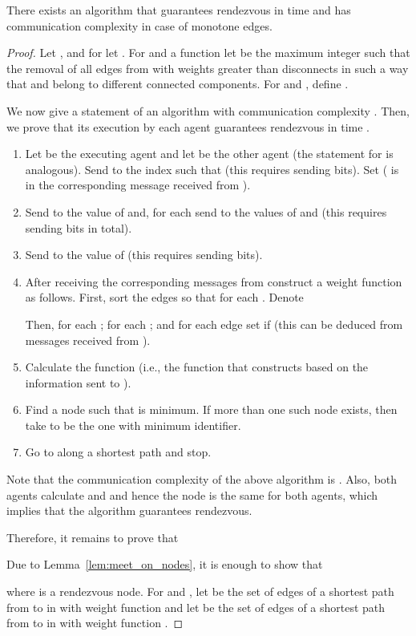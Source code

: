 \documentclass{llncs}
\begin{document}
\begin{theorem} \label{thm:monotone_edges+no-visibility}
There exists an algorithm that guarantees rendezvous in   time and 
has communication complexity  in case of monotone edges.
\end{theorem}
\begin{proof}
Let , and for  let .
For  and a function  let  be the maximum integer such that the removal of all edges from  with weights greater than  disconnects  in such a way that  and  belong to different connected components.
For  and , define .

We now give a statement of an algorithm with communication complexity .
Then, we prove that its execution by each agent guarantees rendezvous in time .
\begin{enumerate}
 \item Let  be the executing agent and let  be the other agent (the statement for  is analogous).
  Send to  the index  such that  (this requires sending  bits).
  Set  ( is in the corresponding message received from ).
 \item Send to  the value of  and, for each  send to  the values of  and  (this requires sending  bits in total).
 \item Send to  the value of  (this requires sending  bits).
 \item After receiving the corresponding messages from 
  construct a weight function  as follows.
  First, sort the edges so that  for each .
  Denote
   
  Then,  for each ;  for each ; and for each edge  set
   if  (this can be deduced from messages received from ).
 \item Calculate the function  (i.e., the function that  constructs based on the information sent to ).
 \item Find a node  such that  is minimum.
  If more than one such node exists, then take  to be the one with minimum identifier.
 \item Go to  along a shortest path and stop.
\end{enumerate}
Note that the communication complexity of the above algorithm is .
Also, both agents calculate  and  and hence the node  is the same for both agents, which implies that the algorithm guarantees rendezvous.

Therefore, it remains to prove that 

Due to Lemma~\ref{lem:meet_on_nodes}, it is enough to show that

where  is a rendezvous node.
For  and , let  be the set of edges of a shortest path from  to  in  with weight function  and let  be the set of edges of a shortest path from  to  in  
with weight function .


\end{proof}
\end{document}
